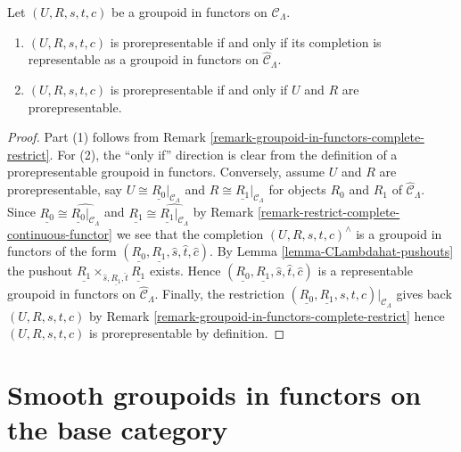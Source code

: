 \begin{lemma}
\label{lemma-groupoid-in-functors-prorep-equivalences}
Let $(U, R, s, t, c)$ be a groupoid in functors on $\mathcal{C}_\Lambda$.
\begin{enumerate}
\item $(U, R, s, t, c)$ is prorepresentable if and only if its completion is
representable as a groupoid in functors on $\widehat{\mathcal{C}}_\Lambda$.
\item $(U, R, s, t, c)$ is prorepresentable if and only if $U$ and $R$ are
prorepresentable.
\end{enumerate}
\end{lemma}

\begin{proof}
Part (1) follows from
Remark \ref{remark-groupoid-in-functors-complete-restrict}.
For (2), the ``only if'' direction is clear from the definition
of a prorepresentable groupoid in functors. Conversely, assume $U$ and $R$
are prorepresentable, say $U \cong \underline{R_0}|_{\mathcal{C}_\Lambda}$
and $R \cong \underline{R_1}|_{\mathcal{C}_\Lambda}$ for objects $R_0$ and
$R_1$ of $\widehat{\mathcal{C}}_\Lambda$.
Since $\underline{R_0} \cong \widehat{\underline{R_0}|_{\mathcal{C}_\Lambda}}$
and $\underline{R_1} \cong \widehat{\underline{R_1}|_{\mathcal{C}_\Lambda}}$
by
Remark \ref{remark-restrict-complete-continuous-functor}
we see that the completion $(U, R, s, t, c)^\wedge$ is a groupoid in
functors of the form
$(\underline{R_0}, \underline{R_1}, \widehat{s}, \widehat{t}, \widehat{c})$.
By
Lemma \ref{lemma-CLambdahat-pushouts}
the pushout
$\underline{R_1} \times_{\widehat{s}, \underline{R_1}, \widehat{t}}
\underline{R_1}$ exists. Hence
$(\underline{R_0}, \underline{R_1}, \widehat{s}, \widehat{t}, \widehat{c})$
is a representable groupoid in functors on $\widehat{\mathcal{C}}_\Lambda$.
Finally, the restriction
$(\underline{R_0}, \underline{R_1}, s, t, c)|_{\mathcal{C}_\Lambda}$
gives back $(U, R, s, t, c)$ by
Remark \ref{remark-groupoid-in-functors-complete-restrict}
hence $(U, R, s, t, c)$ is prorepresentable by definition.
\end{proof}






\section{Smooth groupoids in functors on the base category}
\label{section-smooth-minimal-groupoids-in-functors}

